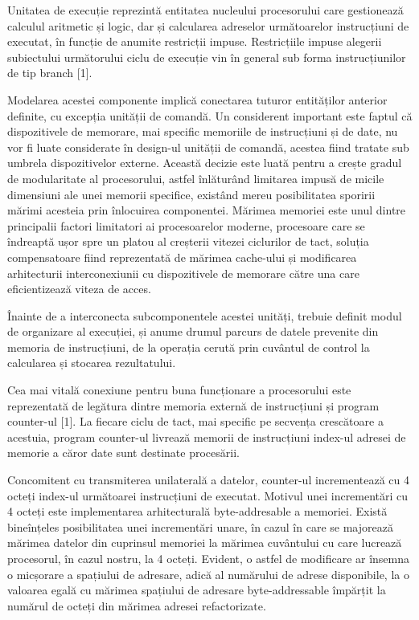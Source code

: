 \documentclass[12pt]{article}
\begin{document}
Unitatea de execuție reprezintă entitatea nucleului procesorului care gestionează calculul aritmetic și logic, dar și calcularea adreselor următoarelor instrucțiuni de executat, în funcție de anumite restricții impuse. Restricțiile impuse alegerii subiectului următorului ciclu de execuție vin în general sub forma instrucțiunilor de tip branch [1]. 
 
Modelarea acestei componente implică conectarea tuturor entităților anterior definite, cu excepția unității de comandă. Un considerent important este faptul că dispozitivele de memorare, mai specific memoriile de instrucțiuni și de date, nu vor fi luate considerate în design-ul unității de comandă, acestea fiind tratate sub umbrela dispozitivelor externe. Această decizie este luată pentru a crește gradul de modularitate al procesorului, astfel înlăturând limitarea impusă de micile dimensiuni ale unei memorii specifice, existând mereu posibilitatea sporirii mărimi acesteia prin înlocuirea componentei. Mărimea memoriei este unul dintre principalii factori limitatori ai procesoarelor moderne, procesoare care se îndreaptă ușor spre un platou al creșterii vitezei ciclurilor de tact, soluția compensatoare fiind reprezentată de mărimea cache-ului și modificarea arhitecturii interconexiunii cu dispozitivele de memorare către una care eficientizează viteza de acces.

Înainte de a interconecta subcomponentele acestei unități, trebuie definit modul de organizare al execuției, și anume drumul parcurs de datele prevenite din memoria de instrucțiuni, de la operația cerută prin cuvântul de control la calcularea și stocarea rezultatului.

Cea mai vitală conexiune pentru buna funcționare a procesorului este reprezentată de legătura dintre memoria externă de instrucțiuni și program counter-ul [1]. La fiecare ciclu de tact, mai specific pe secvența crescătoare a acestuia, program counter-ul livrează memorii de instrucțiuni index-ul adresei de memorie a căror date sunt destinate procesării.

 Concomitent cu transmiterea unilaterală a datelor, counter-ul incrementează cu 4 octeți index-ul următoarei instrucțiuni de executat. Motivul unei incrementări cu 4 octeți este implementarea arhitecturală byte-addresable a memoriei. Există bineînțeles posibilitatea unei incrementări unare, în cazul în care se majorează mărimea datelor din cuprinsul memoriei la mărimea cuvântului cu care lucrează procesorul, în cazul nostru, la 4 octeți. Evident, o astfel de modificare ar însemna o micșorare a spațiului de adresare, adică al numărului de adrese disponibile, la o valoarea egală cu mărimea spațiului de adresare byte-addressable împărțit la numărul de octeți din mărimea adresei refactorizate.
 
\end{document}
